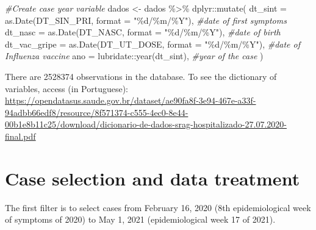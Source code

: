 \documentclass[
]{article}
\newenvironment{Shaded}{\begin{snugshade}}{\end{snugshade}}
\newcommand{\AttributeTok}[1]{\textcolor[rgb]{0.77,0.63,0.00}{#1}}
\newcommand{\CommentTok}[1]{\textcolor[rgb]{0.56,0.35,0.01}{\textit{#1}}}
\newcommand{\FunctionTok}[1]{\textcolor[rgb]{0.00,0.00,0.00}{#1}}
\newcommand{\NormalTok}[1]{#1}
\newcommand{\OtherTok}[1]{\textcolor[rgb]{0.56,0.35,0.01}{#1}}
\newcommand{\SpecialCharTok}[1]{\textcolor[rgb]{0.00,0.00,0.00}{#1}}
\newcommand{\StringTok}[1]{\textcolor[rgb]{0.31,0.60,0.02}{#1}}
\begin{document}
\begin{Shaded}
\begin{Highlighting}[]
\CommentTok{\#Create case year variable}
\NormalTok{dados }\OtherTok{\textless{}{-}}\NormalTok{  dados }\SpecialCharTok{\%\textgreater{}\%}
\NormalTok{  dplyr}\SpecialCharTok{::}\FunctionTok{mutate}\NormalTok{(}
    \AttributeTok{dt\_sint =} \FunctionTok{as.Date}\NormalTok{(DT\_SIN\_PRI, }\AttributeTok{format =} \StringTok{"\%d/\%m/\%Y"}\NormalTok{), }\CommentTok{\#date of first symptoms}
    \AttributeTok{dt\_nasc =} \FunctionTok{as.Date}\NormalTok{(DT\_NASC, }\AttributeTok{format =} \StringTok{"\%d/\%m/\%Y"}\NormalTok{), }\CommentTok{\#date of birth}
    \AttributeTok{dt\_vac\_gripe =} \FunctionTok{as.Date}\NormalTok{(DT\_UT\_DOSE, }\AttributeTok{format =} \StringTok{"\%d/\%m/\%Y"}\NormalTok{), }\CommentTok{\#date of Influenza vaccine}
    \AttributeTok{ano =}\NormalTok{ lubridate}\SpecialCharTok{::}\FunctionTok{year}\NormalTok{(dt\_sint), }\CommentTok{\#year of the case}
\NormalTok{  )}
\end{Highlighting}
\end{Shaded}

There are 2528374 observations in the database. To see the dictionary of
variables, access (in Portuguese):
\url{https://opendatasus.saude.gov.br/dataset/ae90fa8f-3e94-467e-a33f-94adbb66edf8/resource/8f571374-c555-4ec0-8e44-00b1e8b11c25/download/dicionario-de-dados-srag-hospitalizado-27.07.2020-final.pdf}

\hypertarget{case-selection-and-data-treatment}{%
\section{Case selection and data
treatment}\label{case-selection-and-data-treatment}}

The first filter is to select cases from February 16, 2020 (8th
epidemiological week of symptoms of 2020) to May 1, 2021
(epidemiological week 17 of 2021).
\end{document}
